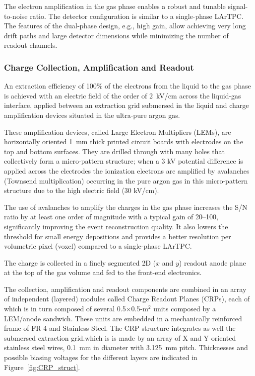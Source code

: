 The electron amplification in the gas phase enables a robust and tunable signal-to-noise ratio. 
The detector configuration is similar to a single-phase LArTPC. The features of the dual-phase design, e.g., high gain, 
allow achieving very long drift paths and large detector dimensions while minimizing the number of readout channels.

\subsubsection{Charge Collection, Amplification and Readout}

An extraction efficiency of 100\% of the electrons from the liquid to
the gas phase is achieved with an electric field of the order of
2~kV/cm across the liquid-gas interface, applied between an 
extraction grid submersed in the liquid and charge amplification 
devices situated in the ultra-pure argon gas. 

These amplification devices, called Large Electron Multipliers (LEMs), are horizontally oriented 1~mm thick printed 
circuit boards with electrodes on the top and bottom surfaces. They are drilled
through with many holes that collectively form a micro-pattern structure;  
when a 3 kV potential difference is applied across the electrodes
the ionization electrons are amplified by avalanches (Townsend multiplication) occurring in the 
pure argon gas in this micro-pattern structure\cite{Bondar:2008yw} due to the high electric field (30 kV/cm).

The use of avalanches to amplify the charges in the gas phase increases
the S/N ratio by at least one order of magnitude with a typical gain of 20--100, significantly
improving the event reconstruction quality. It also lowers the
threshold for small energy depositions and provides a better
resolution per volumetric pixel (voxel) compared to a single-phase
LArTPC. 

The charge is collected in a finely segmented 2D ($x$ and $y$) readout anode
plane at the top of the gas volume and fed to the front-end electronics.   

The  collection, amplification and readout components are combined in an array of 
independent (layered) modules called Charge Readout Planes (CRPs), each of which is in
 turn composed of several 0.5$\times$0.5-m$^2$ units composed  by a LEM/anode sandwich. 
These units are embedded in a mechanically reinforced frame of FR-4 and Stainless Steel. The CRP structure integrates
as well the submersed extraction grid.which is is made by an array of X and Y oriented stainless steel wires, 0.1~mm in diameter with 3.125~mm
pitch. Thicknesses and possible biasing voltages for the different layers are indicated in Figure~\ref{fig:CRP_struct}.

